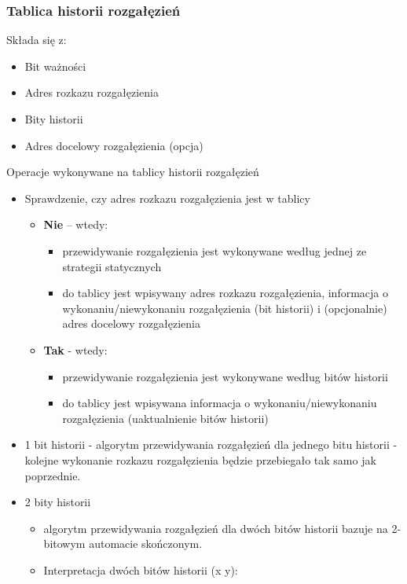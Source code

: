 \begin{enumerate}
	   		\subsubsection{Tablica historii rozgałęzień}
	   		Składa się z:
	   		\begin{itemize}
	   			\item Bit ważności
	   			\item Adres rozkazu rozgałęzienia
	   			\item Bity historii
	   			\item Adres docelowy rozgałęzienia (opcja)
	   		\end{itemize}
	   		Operacje wykonywane na tablicy historii rozgałęzień
	   		\begin{itemize}
	   			\item Sprawdzenie, czy adres rozkazu rozgałęzienia jest w tablicy
	   			\begin{itemize}
	   				\item \textbf{Nie} – wtedy:
	   				\begin{itemize}
	   					\item przewidywanie rozgałęzienia jest wykonywane według jednej ze strategii statycznych
	   					\item do tablicy jest wpisywany adres rozkazu rozgałęzienia, informacja o wykonaniu/niewykonaniu rozgałęzienia (bit historii) i (opcjonalnie) adres docelowy rozgałęzienia
	   				\end{itemize}
	   				\item \textbf{Tak} - wtedy:
	   				\begin{itemize}
	   					\item przewidywanie rozgałęzienia jest wykonywane według bitów historii
	   					\item do tablicy jest wpisywana informacja o wykonaniu/niewykonaniu rozgałęzienia (uaktualnienie bitów historii)
	   				\end{itemize}
	   			\end{itemize}
	   			\item 1 bit historii - algorytm przewidywania rozgałęzień dla jednego bitu historii - kolejne wykonanie rozkazu rozgałęzienia będzie przebiegało tak samo jak poprzednie.
	   			\item 2 bity historii
	   			\begin{itemize}
	   				\item algorytm przewidywania rozgałęzień dla dwóch bitów historii bazuje na 2-bitowym automacie skończonym.
	   				\item Interpretacja dwóch bitów historii (x y):

\end{itemize}
\end{itemize}
\end{enumerate}
